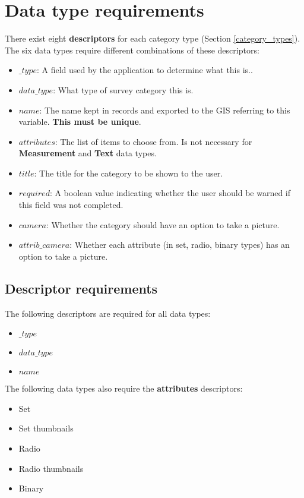 \documentclass{scrreprt}
\begin{document}
\section{Data type requirements}
\label{descriptors}
There exist eight \textbf{descriptors} for each category type (Section \ref{category_types}). The six data types require different combinations of these descriptors:

\begin{itemize}
\item $\_type$:  A field used by the application to determine what this is..
\item $data\_type$: What type of survey category this is.
\item $name$: The name kept in records and exported to the GIS referring to this variable. \textbf{This must be unique}.
\item $attributes$: The list of items to choose from. Is not necessary for \textbf{Measurement} and \textbf{Text} data types.
\item $title$: The title for the category to be shown to the user.
\item $required$: A boolean value indicating whether the user should be warned if this field was not completed.
\item $camera$: Whether the category should have an option to take a picture.
\item $attrib\_camera$: Whether each attribute (in set, radio, binary types) has an option to take a picture.
\end{itemize}

\subsection{Descriptor requirements}
The following descriptors are required for all data types:
\begin{itemize}
\item $\_type$
\item $data\_type$
\item $name$
\end{itemize}

The following data types also require the \textbf{attributes} descriptors:
\begin{itemize}
\item Set
\item Set thumbnails
\item Radio
\item Radio thumbnails
\item Binary
\end{itemize}
\end{document}
